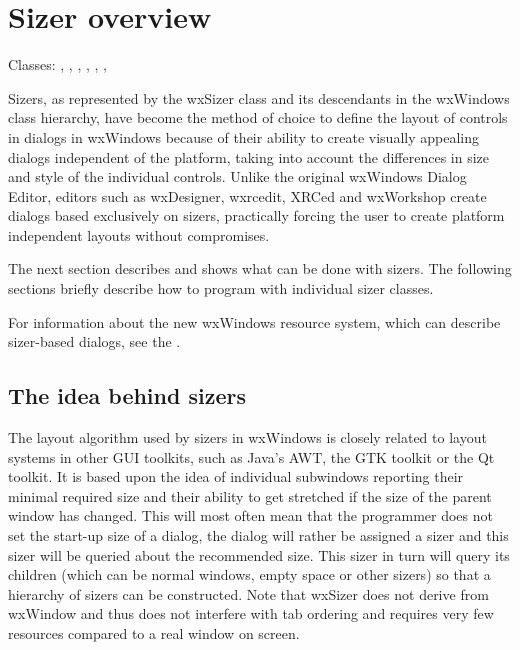 \section{Sizer overview}\label{sizeroverview}

Classes: , , 
, , 
, 
,

Sizers, as represented by the wxSizer class and its descendants in
the wxWindows class hierarchy, have become the method of choice to
define the layout of controls in dialogs in wxWindows because of
their ability to create visually appealing dialogs independent of the
platform, taking into account the differences in size and style of
the individual controls. Unlike the original wxWindows Dialog Editor,
editors such as wxDesigner, wxrcedit, XRCed and wxWorkshop create dialogs based exclusively on sizers,
practically forcing the user to create platform independent layouts without compromises.

The next section describes and shows what can be done with sizers.
The following sections briefly describe how to program with individual sizer classes.

For information about the new wxWindows resource system, which can describe
sizer-based dialogs, see the .

\subsection{The idea behind sizers}\label{ideabehindsizers}

The layout algorithm used by sizers in wxWindows is closely related to layout
systems in other GUI toolkits, such as Java's AWT, the GTK toolkit or the Qt toolkit. It is
based upon the idea of individual subwindows reporting their minimal required
size and their ability to get stretched if the size of the parent window has changed.
This will most often mean that the programmer does not set the start-up size of
a dialog, the dialog will rather be assigned a sizer and this sizer
will be queried about the recommended size. This sizer in turn will query its
children (which can be normal windows, empty space or other sizers) so that
a hierarchy of sizers can be constructed. Note that wxSizer does not derive from wxWindow
and thus does not interfere with tab ordering and requires very few resources compared
to a real window on screen.

